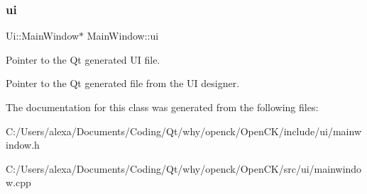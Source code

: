 \subsubsection{\texorpdfstring{ui}{ui}}
{\footnotesize\ttfamily Ui\+::\+Main\+Window$\ast$ Main\+Window\+::ui\hspace{0.3cm}{\ttfamily [private]}}



Pointer to the Qt generated UI file. 

Pointer to the Qt generated file from the UI designer. 

The documentation for this class was generated from the following files\+:\begin{DoxyCompactItemize}
\item 
C\+:/\+Users/alexa/\+Documents/\+Coding/\+Qt/why/openck/\+Open\+C\+K/include/ui/mainwindow.\+h\item 
C\+:/\+Users/alexa/\+Documents/\+Coding/\+Qt/why/openck/\+Open\+C\+K/src/ui/mainwindow.\+cpp\end{DoxyCompactItemize}
